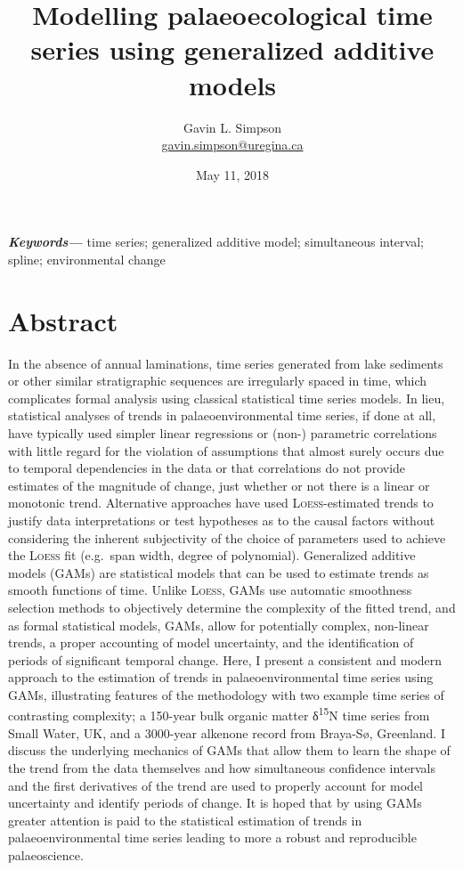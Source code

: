 \documentclass[12pt,]{article}
\title{Modelling palaeoecological time series using generalized additive models}
\author[1]{Gavin L. Simpson\\ \href{mailto:gavin.simpson@uregina.ca}{gavin.simpson@uregina.ca}}
\affil[1]{Institute of Environmental Change and Society, ~University of Regina,
Regina, Saskatchewan, Canada, S4S 0A2}
\date{May 11, 2018}
\newcommand{\loess}{\textsc{Loess}}
\begin{document}
\maketitle

\newcommand*{\keywords}[1]{\textbf{\textit{Keywords---}} #1}
    \keywords{time series; generalized additive model; simultaneous interval; spline;
environmental change}

\makeatletter
\def\fps@figure{tbp}
\makeatother


\section*{Abstract}\label{abstract}

In the absence of annual laminations, time series generated from lake
sediments or other similar stratigraphic sequences are irregularly
spaced in time, which complicates formal analysis using classical
statistical time series models. In lieu, statistical analyses of trends
in palaeoenvironmental time series, if done at all, have typically used
simpler linear regressions or (non-) parametric correlations with little
regard for the violation of assumptions that almost surely occurs due to
temporal dependencies in the data or that correlations do not provide
estimates of the magnitude of change, just whether or not there is a
linear or monotonic trend. Alternative approaches have used
\loess{}-estimated trends to justify data interpretations or test
hypotheses as to the causal factors without considering the inherent
subjectivity of the choice of parameters used to achieve the \loess{}
fit (e.g.~span width, degree of polynomial). Generalized additive models
(GAMs) are statistical models that can be used to estimate trends as
smooth functions of time. Unlike \loess{}, GAMs use automatic smoothness
selection methods to objectively determine the complexity of the fitted
trend, and as formal statistical models, GAMs, allow for potentially
complex, non-linear trends, a proper accounting of model uncertainty,
and the identification of periods of significant temporal change. Here,
I present a consistent and modern approach to the estimation of trends
in palaeoenvironmental time series using GAMs, illustrating features of
the methodology with two example time series of contrasting complexity;
a 150-year bulk organic matter δ\textsuperscript{15}N time series from
Small Water, UK, and a 3000-year alkenone record from Braya-Sø,
Greenland. I discuss the underlying mechanics of GAMs that allow them to
learn the shape of the trend from the data themselves and how
simultaneous confidence intervals and the first derivatives of the trend
are used to properly account for model uncertainty and identify periods
of change. It is hoped that by using GAMs greater attention is paid to
the statistical estimation of trends in palaeoenvironmental time series
leading to more a robust and reproducible palaeoscience.
\end{document}
